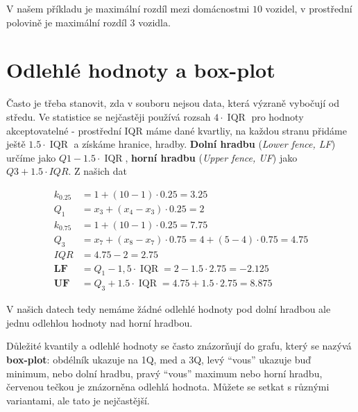 \documentclass[
  czech,
  11pt,
  letterpaper,
  DIV=11,
  numbers=noendperiod]{scrreprt}
\begin{document}
V našem příkladu je maximální rozdíl mezi domácnostmi \(10\) vozidel, v
prostřední polovině je maximální rozdíl \(3\) vozidla.

\section{Odlehlé hodnoty a
box-plot}\label{odlehluxe9-hodnoty-a-box-plot}

Často je třeba stanovit, zda v souboru nejsou data, která výzraně
vybočují od středu. Ve statistice se nejčastěji používá rozsah
\(4\cdot \operatorname{IQR}\) pro hodnoty akceptovatelné - prostřední
IQR máme dané kvartliy, na každou stranu přidáme ještě
\(1.5\cdot \operatorname{IQR}\) a získáme hranice, hradby. \textbf{Dolní
hradbu} (\emph{Lower fence, LF}) určíme jako
\(Q1-1.5\cdot \operatorname{IQR}\), \textbf{horní hradbu} (\emph{Upper
fence, UF}) jako \(Q3+1.5\cdot
IQR\). Z našich dat

\begin{align}
    k_{0.25}      &= 1+(10-1)\cdot 0.25= 3.25\\
    Q_1           &= x_3+(x_4-x_3)\cdot 0.25= 2\\
    k_{0.75}      &= 1+(10-1)\cdot 0.25= 7.75\\
    Q_3           &= x_7+(x_8-x_7)\cdot 0.75= 4+(5-4)\cdot 0.75= 4.75\\
    IQR           &= 4.75-2= 2.75\\
    \mathbf{LF}   &= Q_1 - 1,5 \cdot \operatorname{IQR} = 2 - 1.5 \cdot 2.75 = -2.125\\
    \mathbf{UF}   &=Q_3 + 1.5 \cdot \operatorname{IQR} = 4.75 + 1.5 \cdot 2.75 = 8.875
\end{align}

V našich datech tedy nemáme žádné odlehlé hodnoty pod dolní hradbou ale
jednu odlehlou hodnoty nad horní hradbou.

Důležité kvantily a odlehlé hodnoty se často znázorňují do grafu, který
se nazývá \textbf{box-plot}: obdélník ukazuje na 1Q, med a 3Q, levý
``vous'' ukazuje buď minimum, nebo dolní hradbu, pravý ``vous'' maximum
nebo horní hradbu, červenou tečkou je znázorněna odlehlá hodnota. Můžete
se setkat s různými variantami, ale tato je nejčastější.
\end{document}

